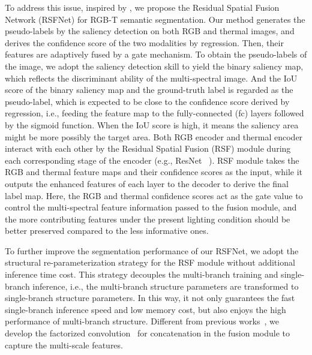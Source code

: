 \documentclass[10.5pt,twocolumn,journal,letterpaper]{IEEEtran}
\newcommand{\eg}{e.g.}
\newcommand{\ie}{i.e.}
\begin{document}
To address this issue, inspired by \cite{chen-tip2020-dpanet}, we propose the Residual Spatial Fusion Network (RSFNet) for RGB-T semantic segmentation. Our method generates the pseudo-labels by the saliency detection on both RGB and thermal images, and derives the confidence score of the two modalities by regression. Then, their features are adaptively fused by a gate mechanism. To obtain the pseudo-labels of the image, we adopt the saliency detection \cite{montabone-ivc2010-human} skill to yield the binary saliency map, which reflects the discriminant ability of the multi-spectral image. And the IoU score of the binary saliency map and the ground-truth label is regarded as the pseudo-label, which is expected to be close to the confidence score derived by regression, \ie, feeding the feature map to the fully-connected (fc) layers followed by the sigmoid function. When the IoU score is high, it means the saliency area might be more possibly the target area. Both RGB encoder and thermal encoder interact with each other by the Residual Spatial Fusion (RSF) module during each corresponding stage of the encoder (\eg, ResNet~ \cite{he-cvpr2016-resnet}). RSF module takes the RGB and thermal feature maps and their confidence scores as the input, while it outputs the enhanced features of each layer to the decoder to derive the final label map. Here, the RGB and thermal confidence scores act as the gate value to control the multi-spectral feature information passed to the fusion module, and the more contributing features under the present lighting condition should be better preserved compared to the less informative ones. 

To further improve the segmentation performance of our RSFNet, we adopt the structural re-parameterization \cite{ding-cvpr2021-repvgg, ding-cvpr2021-dbb} strategy for the RSF module without additional inference time cost. This strategy decouples the multi-branch training and single-branch inference, \ie, the multi-branch structure parameters are transformed to single-branch structure parameters. In this way, it not only guarantees the fast single-branch inference speed and low memory cost, but also enjoys the high performance of multi-branch structure. Different from previous works~\cite{ding-cvpr2021-repvgg,ding-cvpr2021-dbb}, we develop the factorized convolution~\cite{szegedy-cvpr2016-inceptionv3} for concatenation in the fusion module to capture the multi-scale features. 
\end{document}
